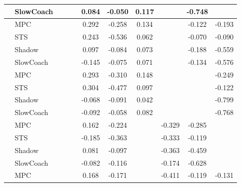 \begin{tabular}{|l|l|*{9}{c|}}
                                                           & SlowCoach &       &        &        &  0.084 & -0.050 &  0.117 &      &  -0.748 &       \\
\midrule
[False, False, False, True, True, True, False, True, True] & MPC &       &        &        &  0.292 & -0.258 &  0.134 &      &  -0.122 &   -0.193 \\
                                                           & STS &       &        &        &  0.243 & -0.536 &  0.062 &      &  -0.070 &   -0.090 \\
                                                           & Shadow &       &        &        &  0.097 & -0.084 &  0.073 &      &  -0.188 &   -0.559 \\
                                                           & SlowCoach &       &        &        & -0.145 & -0.075 &  0.071 &      &  -0.134 &   -0.576 \\
\midrule
[False, False, False, True, True, True, False, False, True] & MPC &       &        &        &  0.293 & -0.310 &  0.148 &      &      &   -0.249 \\
                                                           & STS &       &        &        &  0.304 & -0.477 &  0.097 &      &      &   -0.122 \\
                                                           & Shadow &       &        &        & -0.068 & -0.091 &  0.042 &      &      &   -0.799 \\
                                                           & SlowCoach &       &        &        & -0.092 & -0.058 &  0.082 &      &      &   -0.768 \\
\midrule
[False, False, False, True, True, False, True, True, False] & MPC &       &        &        &  0.162 & -0.224 &     &  -0.329 &  -0.285 &       \\
                                                           & STS &       &        &        & -0.185 & -0.363 &     &  -0.333 &  -0.119 &       \\
                                                           & Shadow &       &        &        &  0.081 & -0.097 &     &  -0.363 &  -0.459 &       \\
                                                           & SlowCoach &       &        &        & -0.082 & -0.116 &     &  -0.174 &  -0.628 &       \\
\midrule
[False, False, False, True, True, False, True, True, True] & MPC &       &        &        &  0.168 & -0.171 &     &  -0.411 &  -0.119 &   -0.131 \\

\end{tabular}
